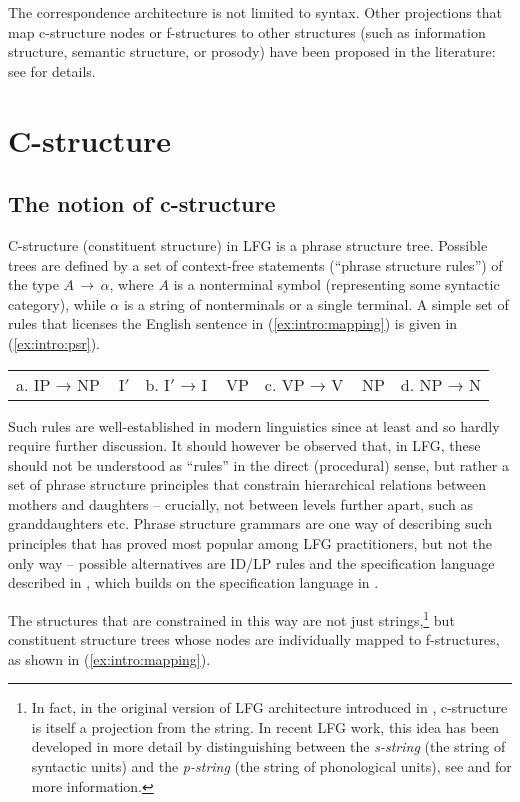 \documentclass[output=paper]{langscibook}
\begin{document}
    The correspondence architecture is not limited to syntax. Other projections that map c-structure nodes or f-structures to other structures (such as information structure, semantic structure, or prosody) have been proposed in the literature: see  for details.
 
 \section{C-structure\label{sect:intro:c-structure}}
 
 \subsection{The notion of c-structure}
 
 C-structure (constituent structure) in LFG is a phrase structure tree. Possible trees are defined by a set of context-free statements (``phrase structure rules'') of the type $A\, →\, \alpha$, where $A$ is a nonterminal symbol (representing some syntactic category), while $\alpha$ is a string of nonterminals or a single terminal. A simple set of rules that licenses  the English sentence in (\ref{ex:intro:mapping}) is given in (\ref{ex:intro:psr}). 
 
 \ea\label{ex:intro:psr}
 \begin{tabular}[t]{llll}
 a. IP → NP ~ I$'$ & b. I$'$ → I ~ VP & c. VP → V ~ NP & d. NP → N
 \end{tabular}
 \z
 
 Such rules are well-established in modern linguistics since at least \textcite{chomsky1957syntactic} and so hardly require further discussion. It should however be observed that, in LFG, these should not be understood as ``rules'' in the direct (procedural) sense, but rather a set of phrase structure principles that constrain hierarchical relations between mothers and daughters -- crucially, not between levels further apart, such as granddaughters etc. Phrase structure grammars are one way of describing such principles that has proved most popular among LFG practitioners, but not the only way -- possible alternatives are ID/LP rules \parencite{falk1983} and the specification language described in \textcite{potts2002}, which builds on the specification language in \textcite{blackburn1995a-specification}.
 
 The structures that are constrained in this way are not just strings,\footnote{In fact, in the original version of LFG architecture introduced in \textcite{kapl:89}, c-structure is itself a projection from the string. In recent LFG work, this idea has been developed in more detail by distinguishing between the \textit{s-string} (the string of syntactic units) and the \textit{p-string} (the string of phonological units), see \textcite{DM11} and  for more information.} but constituent structure trees whose nodes are individually mapped to f-structures, as shown in (\ref{ex:intro:mapping}).
 
\end{document}
